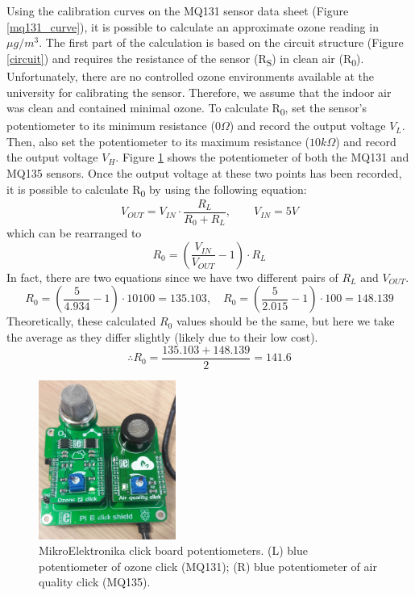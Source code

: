 \documentclass[11pt,twosided,a4paper]{report}
\begin{document}
Using the calibration curves on the MQ131 sensor data sheet (Figure \ref{mq131_curve}), it is possible to calculate an approximate ozone reading in $\mu g/m^3$. The first part of the calculation is based on the circuit structure (Figure \ref{circuit}) and requires the resistance of the sensor (R\textsubscript{S}) in clean air (R\textsubscript{0}). Unfortunately, there are no controlled ozone environments available at the university for calibrating the sensor. Therefore, we assume that the indoor air was clean and contained minimal ozone. To calculate R\textsubscript{0}, set the sensor's potentiometer to its minimum resistance ($0\Omega$) and record the output voltage $V_L$. Then, also set the potentiometer to its maximum resistance ($10k\Omega$) and record the output voltage $V_H$. Figure \ref{potentiometer} shows the potentiometer of both the MQ131 and MQ135 sensors. Once the output voltage at these two points has been recorded, it is possible to calculate R\textsubscript{0} by using the following equation:
\begin{equation}
V_{OUT} = V_{IN} \cdot \frac{R_L}{R_0 + R_L}, \qquad V_{IN} = 5V
\end{equation}
which can be rearranged to
\begin{equation}
R_0 = (\frac{V_{IN}}{V_{OUT}} - 1) \cdot R_L
\end{equation}
In fact, there are two equations since we have two different pairs of $R_L$ and $V_{OUT}$.
\begin{equation}
R_0 = (\frac{5}{4.934} - 1) \cdot 10100 = 135.103 , \quad R_0 = (\frac{5}{2.015} - 1) \cdot 100 = 148.139
\end{equation}
Theoretically, these calculated $R_0$ values should be the same, but here we take the average as they differ slightly (likely due to their low cost).
\begin{equation}
\therefore R_0 = \frac{135.103 + 148.139}{2} = 141.6
\end{equation}

\begin{figure}[!tb]
\centering
\includegraphics[width=0.4\textwidth]{potentiometer}
\caption[MikroElektronika potentiometers]{MikroElektronika click board potentiometers. (L) blue potentiometer of ozone click (MQ131); (R) blue potentiometer of air quality click (MQ135).}
\label{potentiometer}
\end{figure}
\end{document}
